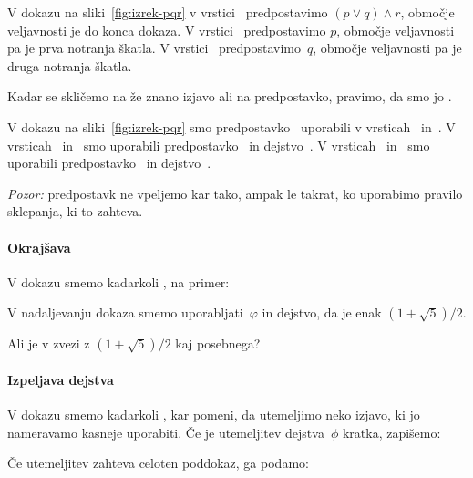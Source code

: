 \begin{zgled}
  V dokazu na sliki~\ref{fig:izrek-pqr} v vrstici~ predpostavimo $(p \lor q) \land r$, območje veljavnosti je do konca dokaza. V vrstici~ predpostavimo $p$, območje veljavnosti pa je prva notranja škatla. V vrstici~ predpostavimo~$q$, območje veljavnosti pa je druga notranja škatla.
\end{zgled}

Kadar se skličemo na že znano izjavo ali na predpostavko, pravimo, da smo jo .

\begin{zgled}
  V dokazu na sliki~\ref{fig:izrek-pqr} smo predpostavko~ uporabili v vrsticah~ in~.
  V vrsticah~ in~ smo uporabili predpostavko~ in dejstvo~.
  V vrsticah~ in~ smo uporabili predpostavko~ in dejstvo~.
\end{zgled}

\emph{Pozor:} predpostavk ne vpeljemo kar tako, ampak le takrat, ko uporabimo pravilo sklepanja, ki to zahteva.

\paragraph*{Okrajšava}
\label{sec:okraj}

V dokazu smemo kadarkoli , na primer:
%
\begin{quote}
\end{quote}
%
V nadaljevanju dokaza smemo uporabljati~$\varphi$ in dejstvo, da je enak $(1 + \sqrt{5})/2$.

\begin{vaja}
  Ali je v zvezi z $(1 + \sqrt{5})/2$ kaj posebnega?
\end{vaja}

\paragraph*{Izpeljava dejstva}
\label{sec:izpelj-dejstva}

V dokazu smemo kadarkoli , kar pomeni, da utemeljimo neko izjavo, ki jo nameravamo kasneje uporabiti. Če je utemeljitev dejstva~$\phi$ kratka, zapišemo:
%
\begin{quote}
\end{quote}
%
Če utemeljitev zahteva celoten poddokaz, ga podamo:
%
\begin{boxDisplay}
  \begin{boxedProof}
    \begin{boxFrame}
    \end{boxFrame}
  \end{boxedProof}
\end{boxDisplay}

